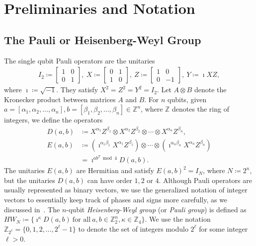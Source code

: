 \documentclass[twoside,romanappendices]{IEEEtran}
\begin{document}
\section{Preliminaries and Notation}
\label{sec:prelim}


\subsection{The Pauli or Heisenberg-Weyl Group}
\label{sec:pauli_gp}


The single qubit Pauli operators are the unitaries
\begin{align}
I_2 \coloneqq 
\begin{bmatrix}
1 & 0 \\
0 & 1
\end{bmatrix},\ 
X \coloneqq 
\begin{bmatrix}
0 & 1 \\
1 & 0
\end{bmatrix}, \ 
Z \coloneqq 
\begin{bmatrix}
1 & 0 \\
0 & -1
\end{bmatrix}, \ 
Y \coloneqq \imath X Z, 
\end{align}
where $\imath \coloneqq \sqrt{-1}$.
They satisfy $X^2 = Z^2 = Y^2 = I_2$.
Let $A \otimes B$ denote the Kronecker product between matrices $A$ and $B$.
For $n$ qubits, given $a = [\alpha_1,\alpha_2,\ldots,\alpha_n], b = [\beta_1,\beta_2,\ldots, \beta_n] \in \mathbb{Z}^n$, where $\mathbb{Z}$ denotes the ring of integers, we define the operators
\begin{align}
D(a,b) & \coloneqq X^{\alpha_1} Z^{\beta_1} \otimes X^{\alpha_2} Z^{\beta_2} \otimes \cdots \otimes X^{\alpha_n} Z^{\beta_n}, \\
%
E(a,b) & \coloneqq \left( \imath^{\alpha_1 \beta_1} X^{\alpha_1} Z^{\beta_1} \right) \otimes \cdots \otimes \left( \imath^{\alpha_n \beta_n} X^{\alpha_n} Z^{\beta_n} \right) \nonumber \\
%
  & = \imath^{ab^T \bmod 4} D(a,b).
\end{align}
The unitaries $E(a,b)$ are Hermitian and satisfy $E(a,b)^2 = I_N$, where $N \coloneqq 2^n$, but the unitaries $D(a,b)$ can have order $1, 2$ or $4$.
Although Pauli operators are usually represented as binary vectors, we use the generalized notation of integer vectors to essentially keep track of phases and signs more carefully, as we discussed in~\cite{Rengaswamy-pra19}.
The $n$-qubit \emph{Heisenberg-Weyl group} (or \emph{Pauli group}) is defined as $HW_N \coloneqq \{ \imath^{\kappa} D(a,b)\ \text{for\ all}\ a,b \in \mathbb{Z}_2^n, \kappa \in \mathbb{Z}_4 \}$. 
We use the notation $\mathbb{Z}_{2^{\ell}} = \{0,1,2,\ldots,2^{\ell} - 1\}$ to denote the set of integers modulo $2^{\ell}$ for some integer $\ell > 0$.
\end{document}
